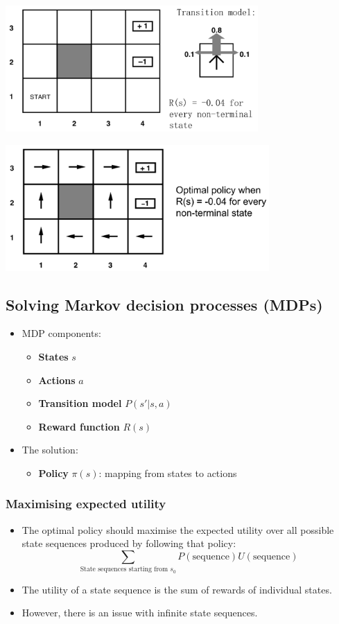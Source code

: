 \documentclass[11pt]{article}
\begin{document}
\begin{center}
\includegraphics[height=13em]{./images/grid-world-diagram.png}
\end{center}

\begin{center}
\includegraphics[height=13em]{./images/grid-world-policy-diagram.png}
\end{center}

 \newpage
\subsection{Solving Markov decision processes (MDPs)}
\label{sec:orgde4e1e2}
\begin{itemize}
\item MDP components:
\begin{itemize}
\item \textbf{States} \(s\)
\item \textbf{Actions} \(a\)
\item \textbf{Transition model} \(P (s' | s, a)\)
\item \textbf{Reward function} \(R (s)\)
\end{itemize}
\item The solution:
\begin{itemize}
\item \textbf{Policy} \(\pi (s)\): mapping from states to actions
\end{itemize}
\end{itemize}
\subsubsection{Maximising expected utility}
\label{sec:org6c2bce3}
\begin{itemize}
\item The optimal policy should maximise the expected utility over all possible state sequences produced by following that policy:
\[\sum_{\text{State sequences starting from } s_0} P (\text{sequence}) U (\text{sequence})\]
\item The utility of a state sequence is the sum of rewards of individual states.
\item However, there is an issue with infinite state sequences.
\end{itemize}
\end{document}
